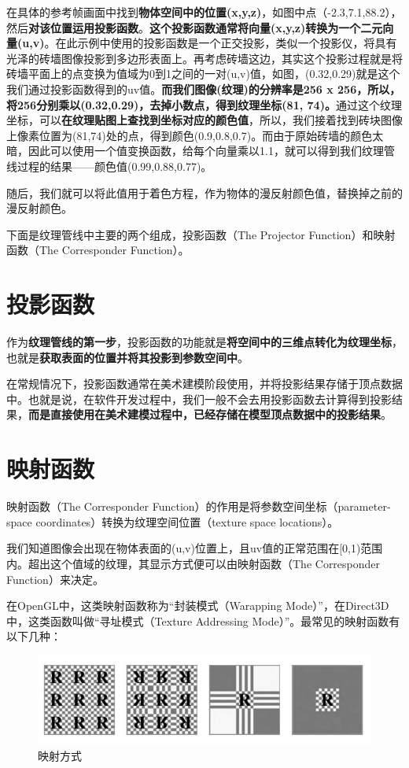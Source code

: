 \documentclass[UTF8,a4paper,12pt]{ctexbook}
\begin{document}
		在具体的参考帧画面中找到\textbf{物体空间中的位置(x,y,z)}，如图中点（-2.3,7.1,88.2），然后\textbf{对该位置运用投影函数}。\color{blue}\textbf{这个投影函数通常将向量(x,y,z)转换为一个二元向量(u,v)}\color{black}。在此示例中使用的投影函数是一个正交投影，类似一个投影仪，将具有光泽的砖墙图像投影到多边形表面上。再考虑砖墙这边，其实这个投影过程就是将砖墙平面上的点变换为值域为0到1之间的一对(u,v)值，如图，(0.32,0.29)就是这个我们通过投影函数得到的uv值。\textbf{而我们图像(纹理)的分辨率是256 x 256，所以，将256分别乘以(0.32,0.29)，去掉小数点，得到纹理坐标(81, 74)。}通过这个纹理坐标，可以\textbf{在纹理贴图上查找到坐标对应的颜色值}，所以，我们接着找到砖块图像上像素位置为(81,74)处的点，得到颜色(0.9,0.8,0.7)。而由于原始砖墙的颜色太暗，因此可以使用一个值变换函数，给每个向量乘以1.1，就可以得到我们纹理管线过程的结果——颜色值(0.99,0.88,0.77)。
		
		随后，我们就可以将此值用于着色方程，作为物体的漫反射颜色值，替换掉之前的漫反射颜色。
		
		下面是纹理管线中主要的两个组成，投影函数（The Projector Function）和映射函数（The Corresponder Function）。
			
	\section{投影函数}
		作为\textbf{纹理管线的第一步}，投影函数的功能就是\textbf{将空间中的三维点转化为纹理坐标}，也就是\textbf{获取表面的位置并将其投影到参数空间中}。
		
		在常规情况下，投影函数通常在美术建模阶段使用，并将投影结果存储于顶点数据中。也就是说，在软件开发过程中，我们一般不会去用投影函数去计算得到投影结果，\textbf{而是直接使用在美术建模过程中，已经存储在模型顶点数据中的投影结果}。
		
	\section{映射函数}
		映射函数（The Corresponder Function）的作用是将参数空间坐标（parameter-space coordinates）转换为纹理空间位置（texture space locations）。
		
		我们知道图像会出现在物体表面的(u,v)位置上，且uv值的正常范围在[0,1)范围内。超出这个值域的纹理，其显示方式便可以由映射函数（The Corresponder Function）来决定。
		
		在OpenGL中，这类映射函数称为“封装模式（Warapping Mode）”，在Direct3D中，这类函数叫做“寻址模式（Texture Addressing Mode）”。最常见的映射函数有以下几种：
			
			\begin{figure}[H]
				\centering
				\includegraphics[scale=0.57]{Mapping}
				\caption{映射方式}
			\end{figure}
			
\end{document}
